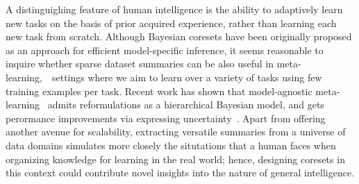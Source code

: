 A distinguighing feature of human intelligence is the ability to adaptively learn new tasks on the basis of prior acquired experience, rather than learning each new task from scratch. Although Bayesian coresets have been originally proposed as an approach for efficient model-specific inference, it seems reasonable to inquire whether sparse dataset summaries can be also useful in meta-learning,~\ie~settings where we aim to learn over a variety of tasks using few training examples per task. Recent work has shown that model-agnostic meta-learning~\citep{finn17} admits reformulations as a hierarchical Bayesian model, and gets perormance improvements via expressing uncertainty~\citep{grant18,finn18}. Apart from offering another avenue for scalability, extracting versatile summaries from a universe of data domains simulates more closely the situtations that a human faces when organizing knowledge for learning in the real world; hence, designing coresets in this context could contribute novel insights into the nature of general intelligence.
